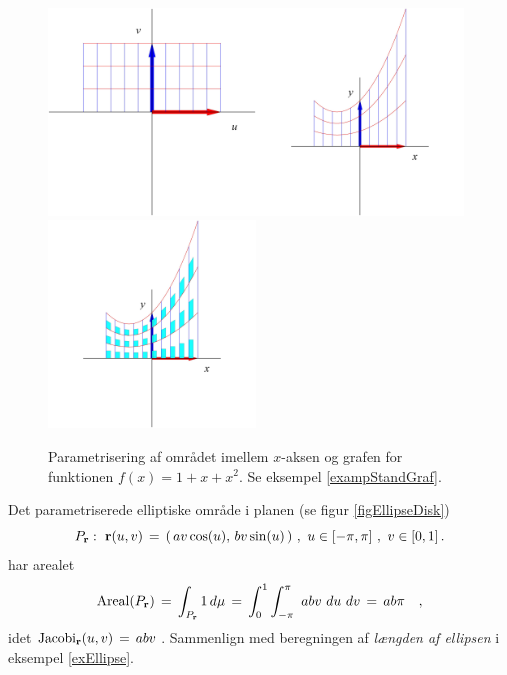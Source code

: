 \begin{figure}[ht]
\centerline{\includegraphics[height=55mm]{FIGS/plotStandGraf1}\includegraphics[height=55mm]{FIGS/plotStandGraf2}\includegraphics[height=55mm]{FIGS/plotStandGraf3} }
\begin{center}
\caption{\small{Parametrisering af området imellem $x$-aksen og grafen for funktionen $f(x) = 1 + x + x^{2}$. Se
eksempel \ref{exampStandGraf}.}} \label{figStandGraf}
\end{center}
\end{figure}







\begin{example} \label{exEllipseDisk}
Det parametriserede elliptiske område i planen (se figur \ref{figEllipseDisk})
$$
P_{\bf r}: \,\, {\bf
r}(u, v) \, = \, \left(\, av\cos(u), \,bv\sin(u) \, \right) \, , \, \, u \in
[-\pi, \pi] \, \, , \, \, v \in [0, 1] \, .
$$
har arealet
$$
\operatorname{Areal}(P_{\bf r}) \, = \, \int_{P_{\bf r}} 1 \, d\mu \, = \,
\int_{0}^{1} \int_{-\pi}^{\pi} \,\, abv \,\,du  \,\, dv \\
  \, = \,   ab \pi \quad,
$$
idet $\operatorname{Jacobi}_{\bf r}(u,v)\,= \, abv\,$. Sammenlign med beregningen af {\em{længden af ellipsen}} i
eksempel \ref{exEllipse}.
\end{example}



